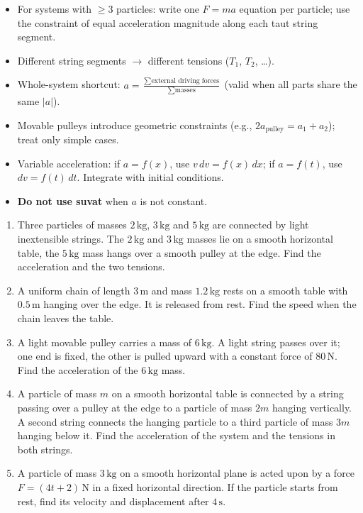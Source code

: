 \documentclass[11pt]{article}
\begin{document}
\begin{aretenir}
\begin{itemize}
\item For systems with $\ge 3$ particles: write one $F=ma$ equation per particle; use the constraint of equal acceleration magnitude along each taut string segment.
\item Different string segments $\rightarrow$ different tensions ($T_1$, $T_2$, \dots).
\item Whole-system shortcut: $a = \frac{\sum \text{external driving forces}}{\sum \text{masses}}$ (valid when all parts share the same $|a|$).
\item Movable pulleys introduce geometric constraints (e.g., $2a_{\text{pulley}} = a_1 + a_2$); treat only simple cases.
\item Variable acceleration: if $a = f(x)$, use $v\,dv = f(x)\,dx$; if $a = f(t)$, use $dv = f(t)\,dt$. Integrate with initial conditions.
\item \textbf{Do not use suvat} when $a$ is not constant.
\end{itemize}
\end{aretenir}

\begin{exercice}
\begin{enumerate}
\item Three particles of masses $2\,\mathrm{kg}$, $3\,\mathrm{kg}$ and $5\,\mathrm{kg}$ are connected by light inextensible strings. The $2\,\mathrm{kg}$ and $3\,\mathrm{kg}$ masses lie on a smooth horizontal table, the $5\,\mathrm{kg}$ mass hangs over a smooth pulley at the edge. Find the acceleration and the two tensions.
\item A uniform chain of length $3\,\mathrm{m}$ and mass $1.2\,\mathrm{kg}$ rests on a smooth table with $0.5\,\mathrm{m}$ hanging over the edge. It is released from rest. Find the speed when the chain leaves the table.
\item A light movable pulley carries a mass of $6\,\mathrm{kg}$. A light string passes over it; one end is fixed, the other is pulled upward with a constant force of $80\,\mathrm{N}$. Find the acceleration of the $6\,\mathrm{kg}$ mass.
\item A particle of mass $m$ on a smooth horizontal table is connected by a string passing over a pulley at the edge to a particle of mass $2m$ hanging vertically. A second string connects the hanging particle to a third particle of mass $3m$ hanging below it. Find the acceleration of the system and the tensions in both strings.
\item A particle of mass $3\,\mathrm{kg}$ on a smooth horizontal plane is acted upon by a force $F = (4t + 2)\,\mathrm{N}$ in a fixed horizontal direction. If the particle starts from rest, find its velocity and displacement after $4\,\mathrm{s}$.
\end{enumerate}
\end{exercice}
\end{document}

